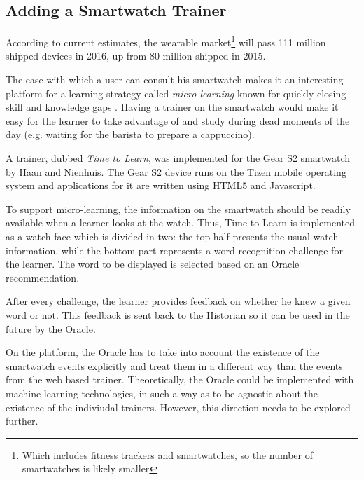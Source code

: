 

\subsection {Adding a Smartwatch Trainer}

According to current estimates, the wearable market\footnote{Which includes fitness trackers and smartwatches, so the number of smartwatches is likely smaller} will pass 111 million shipped devices in 2016, up from 80 million shipped in 2015. 

The ease with which a user can consult his smartwatch makes it an interesting platform for a learning strategy called {\em micro-learning} known for quickly closing skill and knowledge gaps  \cite{Dear12}. Having a trainer on the smartwatch would make it easy for the learner to take advantage of and study during dead moments of the day (e.g. waiting for the barista to prepare a cappuccino).

A trainer, dubbed {\em Time to Learn}, was implemented for the Gear S2 smartwatch by Haan and Nienhuis\cite{Nien16time}. The Gear S2 device runs on the Tizen mobile operating system and applications for it are written using HTML5 and Javascript.

To support micro-learning, the information on the smartwatch should be readily available when a learner looks at the watch. Thus, Time to Learn is implemented as a watch face which is divided in two: the top half presents the usual watch information, while the bottom part represents a word recognition challenge for the learner. The word to be displayed is selected based on an Oracle recommendation. 

After every challenge, the learner provides feedback on whether he knew a given word or not. This feedback is sent back to the Historian so it can be used in the future by the Oracle.


On the platform, the Oracle has to take into account the existence of the smartwatch events explicitly and treat them in a different way than the events from the web based trainer. 
Theoretically, the Oracle could be implemented with machine learning technologies, in such a way as to be agnostic about the existence of the indiviudal trainers. However, this direction needs to be explored further.



